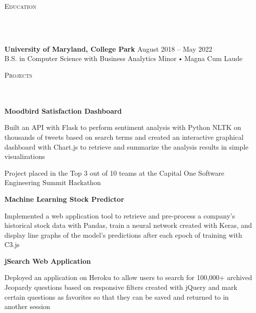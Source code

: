 \documentclass{article}
\newcommand{\header}[1]{{
\hspace*{-15pt}\vspace*{10pt} \large \scshape{#1}} \vspace*{-6pt} 
\lineunder
}
\newcommand{\lineunder}{
\vspace*{-8pt} \\ \hspace*{-18pt} 
\hrulefill \\
}
\newcommand{\school}[4]{
\textbf{#1} #2 \hfill #3 \\ #4 \vspace*{5pt}
}
\newcommand{\project}[4]{{
\vspace*{2pt}%
\textbf{#1} #2 \hfill #3\\ #4 \vspace*{2pt}}
}
\renewcommand{\labelitemi}{
$\vcenter{\hbox{\tiny$\bullet$}}$\hspace*{3pt}
}
\renewcommand{\labelitemii}{
$\vcenter{\hbox{\tiny$\bullet$}}$\hspace*{-3pt}
}
\newenvironment{bullet-list-minor}{
\begin{list}{\labelitemii}{\setlength\leftmargin{15pt} 
\topsep 0pt \itemsep 1pt}}{\vspace*{4pt}\end{list}
}
\begin{document}
\smallskip
\medskip

\header{Education}
    \vspace{4pt}
    \school{University of Maryland, College Park}{}{August 2018 -- May 2022}{\vspace{4pt}  B.S. in Computer Science with Business Analytics Minor \labelitemi Magna Cum Laude}


\medskip

\header{Projects}
    \vspace{4pt}
    \project{Moodbird Satisfaction Dashboard}{}{}{}
    \smallskip
	\begin{bullet-list-minor} 
	\item Built an API with Flask to perform sentiment analysis with Python NLTK on thousands of tweets based on search terms and created an interactive graphical dashboard with Chart.js to retrieve and summarize the analysis results in simple visualizations
	\item Project placed in the Top 3 out of 10 teams at the Capital One Software Engineering Summit Hackathon
    \end{bullet-list-minor}
    \medskip
    
    \project{Machine Learning Stock Predictor}{}{}{}
    \smallskip
	\begin{bullet-list-minor}
	\item Implemented a web application tool to retrieve and pre-process a company's historical stock data with Pandas, train a neural network created with Keras, and display line graphs of the model's predictions after each epoch of training with C3.js
    \end{bullet-list-minor}
    \medskip  
    

    \project{jSearch Web Application}{}{}{}
	\begin{bullet-list-minor}
	\item Deployed an application on Heroku to allow users to search for 100,000+ archived Jeopardy questions based on responsive filters created with jQuery and mark certain questions as favorites so that they can be saved and returned to in another session
    \end{bullet-list-minor}
\end{document}
